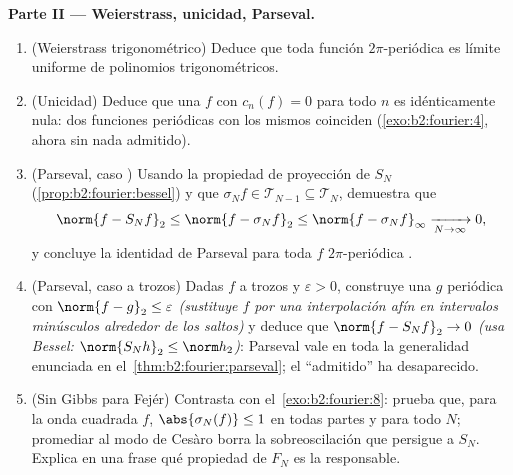 \begin{problem}
\medskip
\noindent\textbf{Parte II --- Weierstrass, unicidad, Parseval.}
\begin{enumerate}[resume]
  \item (Weierstrass trigonométrico) Deduce que toda función
         $2\pi$-periódica es límite uniforme de polinomios
        trigonométricos.
  \item (Unicidad) Deduce que una $f$  con $c_n(f) = 0$ para
        todo $n$ es idénticamente nula: dos funciones periódicas
         con los mismos  coinciden
        (\cref{exo:b2:fourier:4}, ahora sin nada admitido).
  \item (Parseval, caso ) Usando la propiedad de proyección
        de $S_N$ (\cref{prop:b2:fourier:bessel}) y que $\sigma_Nf \in
        \mathcal T_{N-1} \subseteq \mathcal T_N$, demuestra que
        \[
        \norm{f - S_Nf}_2 \leq \norm{f - \sigma_Nf}_2
        \leq \norm{f - \sigma_Nf}_\infty
        \xrightarrow[N\to\infty]{} 0 ,
        \]
        y concluye la identidad de Parseval para toda $f$
        $2\pi$-periódica \emph{}.
  \item (Parseval, caso  a trozos) Dadas $f$  a
        trozos y $\varepsilon > 0$, construye una $g$ periódica
         con $\norm{f - g}_2 \leq \varepsilon$
        \emph{(sustituye $f$ por una interpolación afín en
        intervalos minúsculos alrededor de los saltos)} y deduce que
        $\norm{f - S_Nf}_2 \to 0$ \emph{(usa Bessel: $\norm{S_Nh}_2
        \leq \norm h_2$)}: Parseval vale en toda la generalidad
        enunciada en el~\cref{thm:b2:fourier:parseval}; el
        ``admitido'' ha desaparecido.
  \item (Sin Gibbs para Fejér) Contrasta con el~\cref{exo:b2:fourier:8}: prueba que, para la onda cuadrada
        $f$, $\abs{\sigma_N(f)} \leq 1$ en todas partes y para todo
        $N$; promediar al modo de Cesàro borra la sobreoscilación
        que persigue a $S_N$. Explica en una frase qué propiedad de
        $F_N$ es la responsable.
\end{enumerate}


\end{problem}
